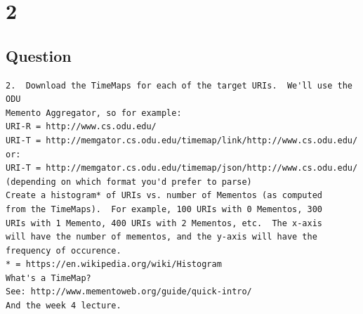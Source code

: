 \documentclass[letterpaper,11pt]{article}
\begin{document}


\clearpage
\section*{2}
\subsection*{Question}
\begin{verbatim}
2.  Download the TimeMaps for each of the target URIs.  We'll use the ODU 
Memento Aggregator, so for example:
URI-R = http://www.cs.odu.edu/
URI-T = http://memgator.cs.odu.edu/timemap/link/http://www.cs.odu.edu/
or:
URI-T = http://memgator.cs.odu.edu/timemap/json/http://www.cs.odu.edu/
(depending on which format you'd prefer to parse)
Create a histogram* of URIs vs. number of Mementos (as computed
from the TimeMaps).  For example, 100 URIs with 0 Mementos, 300
URIs with 1 Memento, 400 URIs with 2 Mementos, etc.  The x-axis
will have the number of mementos, and the y-axis will have the
frequency of occurence.
* = https://en.wikipedia.org/wiki/Histogram
What's a TimeMap?  
See: http://www.mementoweb.org/guide/quick-intro/
And the week 4 lecture. 
\end{verbatim}
\clearpage
\end{document}
